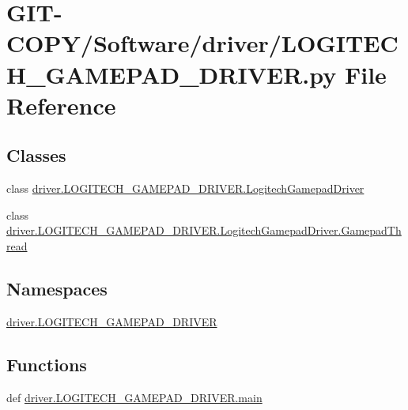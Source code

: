\hypertarget{GIT-COPY_2Software_2driver_2LOGITECH__GAMEPAD__DRIVER_8py}{}\section{G\+I\+T-\/\+C\+O\+P\+Y/\+Software/driver/\+L\+O\+G\+I\+T\+E\+C\+H\+\_\+\+G\+A\+M\+E\+P\+A\+D\+\_\+\+D\+R\+I\+V\+E\+R.py File Reference}
\label{GIT-COPY_2Software_2driver_2LOGITECH__GAMEPAD__DRIVER_8py}
\subsection*{Classes}
\begin{DoxyCompactItemize}
\item 
class \hyperlink{classdriver_1_1LOGITECH__GAMEPAD__DRIVER_1_1LogitechGamepadDriver}{driver.\+L\+O\+G\+I\+T\+E\+C\+H\+\_\+\+G\+A\+M\+E\+P\+A\+D\+\_\+\+D\+R\+I\+V\+E\+R.\+Logitech\+Gamepad\+Driver}
\item 
class \hyperlink{classdriver_1_1LOGITECH__GAMEPAD__DRIVER_1_1LogitechGamepadDriver_1_1GamepadThread}{driver.\+L\+O\+G\+I\+T\+E\+C\+H\+\_\+\+G\+A\+M\+E\+P\+A\+D\+\_\+\+D\+R\+I\+V\+E\+R.\+Logitech\+Gamepad\+Driver.\+Gamepad\+Thread}
\end{DoxyCompactItemize}
\subsection*{Namespaces}
\begin{DoxyCompactItemize}
\item 
 \hyperlink{namespacedriver_1_1LOGITECH__GAMEPAD__DRIVER}{driver.\+L\+O\+G\+I\+T\+E\+C\+H\+\_\+\+G\+A\+M\+E\+P\+A\+D\+\_\+\+D\+R\+I\+V\+E\+R}
\end{DoxyCompactItemize}
\subsection*{Functions}
\begin{DoxyCompactItemize}
\item 
def \hyperlink{namespacedriver_1_1LOGITECH__GAMEPAD__DRIVER_aaa658f6556352e0d77c8437b019f41f9}{driver.\+L\+O\+G\+I\+T\+E\+C\+H\+\_\+\+G\+A\+M\+E\+P\+A\+D\+\_\+\+D\+R\+I\+V\+E\+R.\+main}
\end{DoxyCompactItemize}
